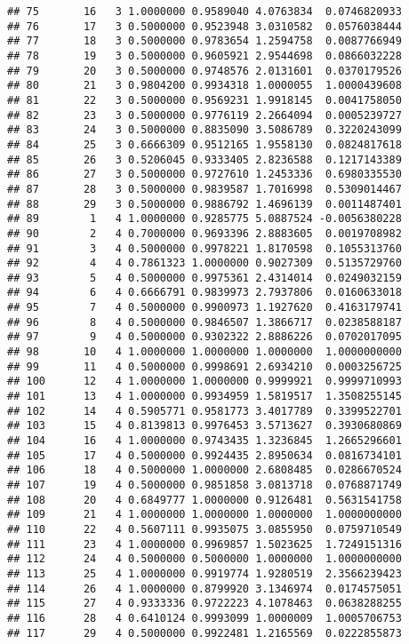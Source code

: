 \documentclass[
]{article}
\begin{document}
\begin{verbatim}
## 75       16   3 1.0000000 0.9589040 4.0763834  0.0746820933
## 76       17   3 0.5000000 0.9523948 3.0310582  0.0576038444
## 77       18   3 0.5000000 0.9783654 1.2594758  0.0087766949
## 78       19   3 0.5000000 0.9605921 2.9544698  0.0866032228
## 79       20   3 0.5000000 0.9748576 2.0131601  0.0370179526
## 80       21   3 0.9804200 0.9934318 1.0000055  1.0000439608
## 81       22   3 0.5000000 0.9569231 1.9918145  0.0041758050
## 82       23   3 0.5000000 0.9776119 2.2664094  0.0005239727
## 83       24   3 0.5000000 0.8835090 3.5086789  0.3220243099
## 84       25   3 0.6666309 0.9512165 1.9558130  0.0824817618
## 85       26   3 0.5206045 0.9333405 2.8236588  0.1217143389
## 86       27   3 0.5000000 0.9727610 1.2453336  0.6980335530
## 87       28   3 0.5000000 0.9839587 1.7016998  0.5309014467
## 88       29   3 0.5000000 0.9886792 1.4696139  0.0011487401
## 89        1   4 1.0000000 0.9285775 5.0887524 -0.0056380228
## 90        2   4 0.7000000 0.9693396 2.8883605  0.0019708982
## 91        3   4 0.5000000 0.9978221 1.8170598  0.1055313760
## 92        4   4 0.7861323 1.0000000 0.9027309  0.5135729760
## 93        5   4 0.5000000 0.9975361 2.4314014  0.0249032159
## 94        6   4 0.6666791 0.9839973 2.7937806  0.0160633018
## 95        7   4 0.5000000 0.9900973 1.1927620  0.4163179741
## 96        8   4 0.5000000 0.9846507 1.3866717  0.0238588187
## 97        9   4 0.5000000 0.9302322 2.8886226  0.0702017095
## 98       10   4 1.0000000 1.0000000 1.0000000  1.0000000000
## 99       11   4 0.5000000 0.9998691 2.6934210  0.0003256725
## 100      12   4 1.0000000 1.0000000 0.9999921  0.9999710993
## 101      13   4 1.0000000 0.9934959 1.5819517  1.3508255145
## 102      14   4 0.5905771 0.9581773 3.4017789  0.3399522701
## 103      15   4 0.8139813 0.9976453 3.5713627  0.3930680869
## 104      16   4 1.0000000 0.9743435 1.3236845  1.2665296601
## 105      17   4 0.5000000 0.9924435 2.8950634  0.0816734101
## 106      18   4 0.5000000 1.0000000 2.6808485  0.0286670524
## 107      19   4 0.5000000 0.9851858 3.0813718  0.0768871749
## 108      20   4 0.6849777 1.0000000 0.9126481  0.5631541758
## 109      21   4 1.0000000 1.0000000 1.0000000  1.0000000000
## 110      22   4 0.5607111 0.9935075 3.0855950  0.0759710549
## 111      23   4 1.0000000 0.9969857 1.5023625  1.7249151316
## 112      24   4 0.5000000 0.5000000 1.0000000  1.0000000000
## 113      25   4 1.0000000 0.9919774 1.9280519  2.3566239423
## 114      26   4 1.0000000 0.8799920 3.1346974  0.0174575051
## 115      27   4 0.9333336 0.9722223 4.1078463  0.0638288255
## 116      28   4 0.6410124 0.9993099 1.0000009  1.0005706753
## 117      29   4 0.5000000 0.9922481 1.2165569  0.0222855873
\end{verbatim}
\end{document}
